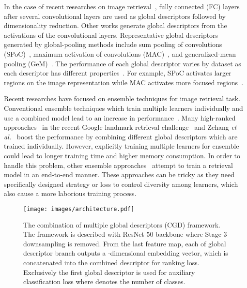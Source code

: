 \documentclass[10pt,twocolumn,letterpaper]{article}
\begin{document}
\begin{CJK}{UTF8}{mj}
In the case of recent researches on image retrieval~\cite{babenko2014neural, gordo2016deep}, fully connected (FC) layers after several convolutional layers are used as global descriptors followed by dimensionality reduction.
Other works generate global descriptors from the activations of the convolutional layers.
Representative global descriptors generated by global-pooling methods include sum pooling of convolutions (SPoC)~\cite{Babenko_2015_ICCV}, maximum activation of convolutions (MAC)~\cite{tolias2015particular}, and generalized-mean pooling (GeM)~\cite{radenovic2018fine}.
The performance of each global descriptor varies by dataset as each descriptor has different properties~\cite{boureau2010theoretical}.
For example, SPoC activates larger regions on the image representation while MAC activates more focused regions~\cite{hoang2017selective}.


Recent researches have focused on ensemble techniques for image retrieval task.
Conventional ensemble techniques which train multiple learners individually and use a combined model lead to an increase in performance~\cite{lin2018regional, Xuan_2018_ECCV, opitz2017bier, Kim_2018_ECCV}.
Many high-ranked approaches~\cite{ozaki2019large, chen20192nd} in the recent Google landmark retrieval challenge~\cite{glc2019} and Zehang \textit{et al.}~\cite{lin2018regional} boost the performance by combining different global descriptors which are trained individually.
However, explicitly training multiple learners for ensemble could lead to longer training time and higher memory consumption.
In order to handle this problem, other ensemble approaches~\cite{Kim_2018_ECCV, opitz2017bier} attempt to train a retrieval model in an end-to-end manner.
These approaches can be tricky as they need specifically designed strategy or loss to control diversity among learners, which also cause a more laborious training process.

\begin{figure*}[h!t!]
\vspace{-1em}
\begin{center}
\texttt{[image: images/architecture.pdf]}
\end{center}
\vspace*{-5mm}
  \caption{The combination of multiple global descriptors (CGD) framework.
  The framework is described with ResNet-50 backbone where Stage 3 downsampling is removed.
  From the last feature map, each of  global descriptor branch outputs a -dimensional embedding vector, which is concatenated into the combined descriptor for ranking loss.
  Exclusively the first global descriptor is used for auxiliary classification loss where  denotes the number of classes.}
\label{fig:architecture}
\vspace{-0.3em}
\end{figure*}


\end{CJK}
\end{document}

